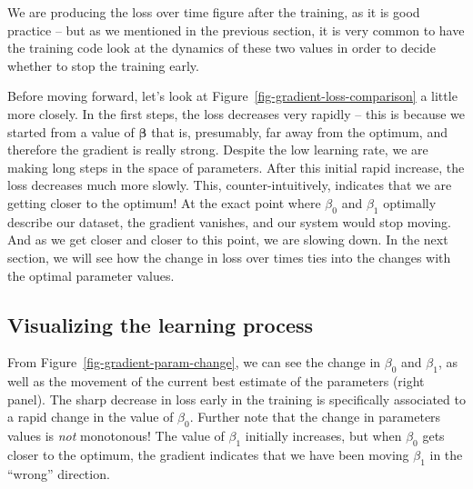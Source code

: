 \documentclass[
  letterpaper,
]{scrbook}
\begin{document}
We are producing the loss over time figure after the training, as it is
good practice -- but as we mentioned in the previous section, it is very
common to have the training code look at the dynamics of these two
values in order to decide whether to stop the training early.

Before moving forward, let's look at
Figure~\ref{fig-gradient-loss-comparison} a little more closely. In the
first steps, the loss decreases very rapidly -- this is because we
started from a value of \(\mathbf{\beta}\) that is, presumably, far away
from the optimum, and therefore the gradient is really strong. Despite
the low learning rate, we are making long steps in the space of
parameters. After this initial rapid increase, the loss decreases much
more slowly. This, counter-intuitively, indicates that we are getting
closer to the optimum! At the exact point where \(\beta_0\) and
\(\beta_1\) optimally describe our dataset, the gradient vanishes, and
our system would stop moving. And as we get closer and closer to this
point, we are slowing down. In the next section, we will see how the
change in loss over times ties into the changes with the optimal
parameter values.

\subsection{Visualizing the learning
process}\label{visualizing-the-learning-process}

From Figure~\ref{fig-gradient-param-change}, we can see the change in
\(\beta_0\) and \(\beta_1\), as well as the movement of the current best
estimate of the parameters (right panel). The sharp decrease in loss
early in the training is specifically associated to a rapid change in
the value of \(\beta_0\). Further note that the change in parameters
values is \emph{not} monotonous! The value of \(\beta_1\) initially
increases, but when \(\beta_0\) gets closer to the optimum, the gradient
indicates that we have been moving \(\beta_1\) in the ``wrong''
direction.
\end{document}
